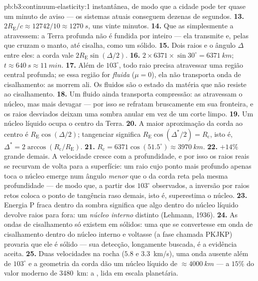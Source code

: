 \begin{solution}{pb:b3:continuum-elasticity:1}
instantânea, de modo que a cidade pode ter quase um minuto de aviso ---
os sistemas atuais conseguem dezenas de segundos.
\textbf{13.} $2R_{\text{E}}/c \approx 12742/10 \approx \qty{1270}{s}$,
uns vinte minutos.
\textbf{14.} Que as  simplesmente a atravessem: a Terra
profunda não é fundida por inteiro --- ela transmite e, pelas 
que cruzam o manto, até cisalha, como um sólido.
\textbf{15.} Dois raios e o ângulo $\Delta$ entre eles: a corda vale
$2R_{\text{E}}\sin(\Delta/2)$.
\textbf{16.} $2 \times 6371 \times \sin30^\circ = \qty{6371}{km}$;
$t \approx \qty{640}{s} \approx \qty{11}{min}$.
\textbf{17.} Além de $103^\circ$, todo raio precisa atravessar uma
região central profunda; se essa região for \emph{fluida} ($\mu = 0$),
ela não transporta onda de cisalhamento: as  morrem ali. Os
fluidos são o estado da matéria que não resiste ao cisalhamento.
\textbf{18.} Um fluido ainda transporta compressão: as 
atravessam o núcleo, mas mais devagar --- por isso se refratam
bruscamente em sua fronteira, e os raios desviados deixam uma sombra
anular em vez de um corte limpo.
\textbf{19.} Um núcleo líquido ocupa o centro da Terra.
\textbf{20.} A maior aproximação da corda ao centro é
$R_{\text{E}}\cos(\Delta/2)$; tangenciar significa
$R_{\text{E}}\cos(\Delta^*/2) = R_{\text{c}}$, isto é, $\Delta^* =
2\arccos(R_{\text{c}}/R_{\text{E}})$.
\textbf{21.} $R_{\text{c}} = 6371\cos(51.5^\circ) \approx
\qty{3970}{km}$.
\textbf{22.} $+14\%$ grande demais. A velocidade cresce com a
profundidade, e por isso os raios reais se recurvam de volta para a
superfície: um raio cujo ponto mais profundo apenas toca o núcleo
emerge num ângulo \emph{menor} que o da corda reta pela mesma
profundidade --- de modo que, a partir dos $103^\circ$ observados, a
inversão por raios retos coloca o ponto de tangência raso demais, isto
é, superestima o núcleo.
\textbf{23.} Energia P fraca dentro da sombra significa que algo
dentro do núcleo líquido devolve raios para fora: um \emph{núcleo
interno} distinto (Lehmann, 1936).
\textbf{24.} As ondas de cisalhamento só existem em sólidos: uma  que se convertesse em onda de cisalhamento dentro do núcleo interno
e voltasse (a fase chamada PKJKP) provaria que ele é sólido --- sua
detecção, longamente buscada, é a evidência aceita.
\textbf{25.} Duas velocidades na rocha ($5.8$ e \qty{3.3}{km/s}), uma
onda ausente além de $103^\circ$ e a geometria da corda dão um núcleo
líquido de $\approx\qty{4000}{km}$ --- a $15\%$ do valor moderno de
\qty{3480}{km}: a , lida em escala planetária.
\end{solution}
